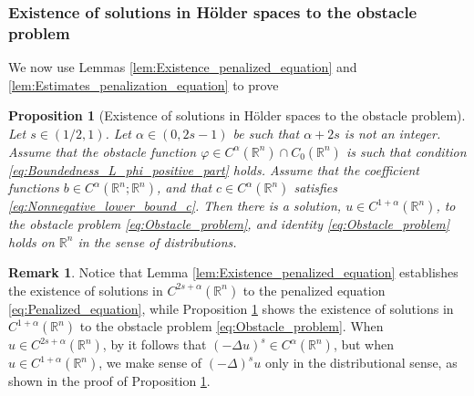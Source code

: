 \documentclass[11pt,reqno]{amsart}
\newtheorem{prop}[thm]{Proposition}
\theoremstyle{definition}
\newtheorem{rmk}[thm]{Remark}
\theoremstyle{remark}
\begin{document}
\subsubsection{Existence of solutions in H\"older spaces to the obstacle problem}
\label{subsec:Existence_solutions_obstacle_problem}
We now use Lemmas \ref{lem:Existence_penalized_equation} and \ref{lem:Estimates_penalization_equation} to prove

\begin{prop}[Existence of solutions in H\"older spaces to the obstacle problem]
\label{prop:Existence_Holder_obstacle_problem}
Let $s\in(1/2,1)$. Let $\alpha\in(0,2s-1)$ be such that $\alpha+2s$ is not an integer. Assume that the obstacle function $\varphi\in C^{\alpha}({\mathbb{R}}^n)\cap C_0({\mathbb{R}}^n)$ is such that condition \eqref{eq:Boundedness_L_phi_positive_part} holds. Assume that the coefficient functions $b \in C^{\alpha}({\mathbb{R}}^n;{\mathbb{R}}^n)$, and that $c \in C^{\alpha}({\mathbb{R}}^n)$ satisfies \eqref{eq:Nonnegative_lower_bound_c}. Then there is a solution, $u\in C^{1+\alpha}({\mathbb{R}}^n)$, to the obstacle problem \eqref{eq:Obstacle_problem}, and identity \eqref{eq:Obstacle_problem} holds on ${\mathbb{R}}^n$ in the sense of distributions. 
\end{prop}

\begin{rmk}
Notice that Lemma \ref{lem:Existence_penalized_equation} establishes the existence of solutions in $C^{2s+\alpha}({\mathbb{R}}^n)$ to the penalized equation \eqref{eq:Penalized_equation}, while Proposition \ref{prop:Existence_Holder_obstacle_problem} shows the existence of solutions in $C^{1+\alpha}({\mathbb{R}}^n)$ to the obstacle problem \eqref{eq:Obstacle_problem}. When $u\in C^{2s+\alpha}({\mathbb{R}}^n)$, by \cite[Proposition 2.6]{Silvestre_2007} it follows that $(-\Delta u)^s\in C^{\alpha}({\mathbb{R}}^n)$, but when $u \in C^{1+\alpha}({\mathbb{R}}^n)$, we make sense of $(-\Delta)^s u$ only in the distributional sense, as shown in the proof of Proposition \ref{prop:Existence_Holder_obstacle_problem}.
\end{rmk}
\end{document}
